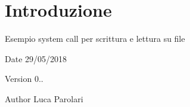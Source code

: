 \hypertarget{index_intro}{}\section{Introduzione}\label{index_intro}
Esempio system call per scrittura e lettura su file

\begin{DoxyDate}{Date}
29/05/2018 
\end{DoxyDate}
\begin{DoxyVersion}{Version}
0.. 
\end{DoxyVersion}
\begin{DoxyAuthor}{Author}
Luca Parolari 
\end{DoxyAuthor}
